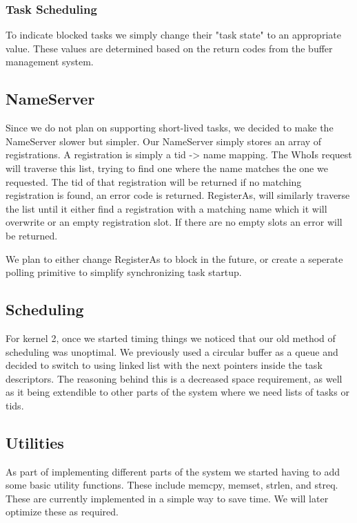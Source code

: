 \documentclass{article}
\begin{document}
\subsubsection{Task Scheduling}

To indicate blocked tasks we simply change their "task state" to an appropriate value. These values are determined based on the return codes from the buffer management system.

\subsection{NameServer}

Since we do not plan on supporting short-lived tasks, we decided to make the NameServer slower but simpler. Our NameServer simply stores an array of registrations. A registration is simply a tid -> name mapping. The WhoIs request will traverse this list, trying to find one where the name matches the one we requested. The tid of that registration will be returned if no matching registration is found, an error code is returned. RegisterAs, will similarly traverse the list until it either find a registration with a matching name which it will overwrite or an empty registration slot. If there are no empty slots an error will be returned.

We plan to either change RegisterAs to block in the future, or create a seperate polling primitive to simplify synchronizing task startup.

\subsection{Scheduling}

For kernel 2, once we started timing things we noticed that our old method of scheduling was unoptimal. We previously used a circular buffer as a queue and decided to switch to using linked list with the next pointers inside the task descriptors. The reasoning behind this is a decreased space requirement, as well as it being extendible to other parts of the system where we need lists of tasks or tids.

\subsection{Utilities}

As part of implementing different parts of the system we started having to add some basic utility functions. These include memcpy, memset, strlen, and streq. These are currently implemented in a simple way to save time. We will later optimize these as required.
\end{document}
